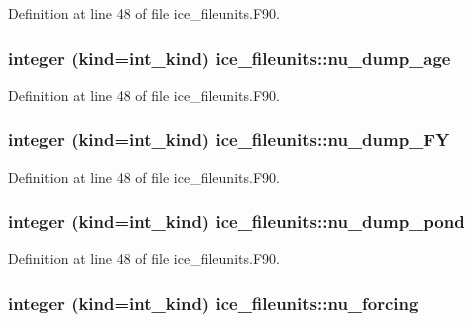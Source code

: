 Definition at line 48 of file ice\_\-fileunits.F90.\hypertarget{namespaceice__fileunits_aed4fd8df7055b78ad592b4395acb95a0}{
\subsubsection[{nu\_\-dump\_\-age}]{\setlength{\rightskip}{0pt plus 5cm}integer (kind=int\_\-kind) {\bf ice\_\-fileunits::nu\_\-dump\_\-age}}}
\label{namespaceice__fileunits_aed4fd8df7055b78ad592b4395acb95a0}


Definition at line 48 of file ice\_\-fileunits.F90.\hypertarget{namespaceice__fileunits_aa4b048a7f0b7630f6ecfb8c0e183cbaa}{
\subsubsection[{nu\_\-dump\_\-FY}]{\setlength{\rightskip}{0pt plus 5cm}integer (kind=int\_\-kind) {\bf ice\_\-fileunits::nu\_\-dump\_\-FY}}}
\label{namespaceice__fileunits_aa4b048a7f0b7630f6ecfb8c0e183cbaa}


Definition at line 48 of file ice\_\-fileunits.F90.\hypertarget{namespaceice__fileunits_a69cd946de2cd0d55f727d51f55a03052}{
\subsubsection[{nu\_\-dump\_\-pond}]{\setlength{\rightskip}{0pt plus 5cm}integer (kind=int\_\-kind) {\bf ice\_\-fileunits::nu\_\-dump\_\-pond}}}
\label{namespaceice__fileunits_a69cd946de2cd0d55f727d51f55a03052}


Definition at line 48 of file ice\_\-fileunits.F90.\hypertarget{namespaceice__fileunits_a946485641238cb0c4d99bb164de395eb}{
\subsubsection[{nu\_\-forcing}]{\setlength{\rightskip}{0pt plus 5cm}integer (kind=int\_\-kind) {\bf ice\_\-fileunits::nu\_\-forcing}}}
\label{namespaceice__fileunits_a946485641238cb0c4d99bb164de395eb}


